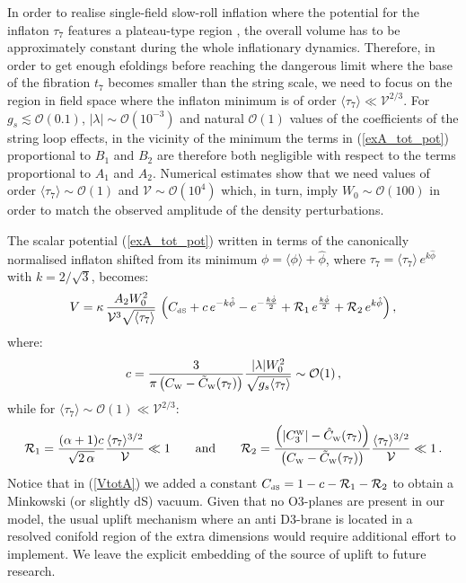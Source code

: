 \documentclass[11pt,a4paper]{article}
\newcommand{\be}{\begin{equation}}
\newcommand{\ee}{\end{equation}}
\def\nn{\nonumber}
\def\W{{\scriptscriptstyle \rm W}}
\def\dS{{\scriptscriptstyle \rm dS}}
\newcommand\vo{{\mathcal{V}}}
\newcommand{\mc}{\mathcal}
\begin{document}
In order to realise single-field slow-roll inflation where the potential for the inflaton $\tau_7$ features a plateau-type region \cite{Cicoli:2008gp, Cicoli:2016chb}, the overall volume has to be approximately constant during the whole inflationary dynamics. Therefore, in order to get enough efoldings before reaching the dangerous limit where the base of the fibration $t_7$ becomes smaller than the string scale, we need to focus on the region in field space where the inflaton minimum is of order $\langle\tau_7\rangle\ll \vo^{2/3}$. For $g_s\lesssim\mc{O}(0.1)$, $|\lambda|\sim\mc{O}(10^{-3})$ and natural $\mc{O}(1)$ values of the coefficients of the string loop effects, in the vicinity of the minimum the terms in (\ref{exA_tot_pot}) proportional to $B_1$ and $B_2$ are therefore both negligible with respect to the terms proportional to $A_1$ and $A_2$. Numerical estimates show that we need values of order $\langle\tau_7\rangle \sim\mc{O}(1)$ and $\vo \sim\mc{O}(10^4)$ which, in turn, imply $W_0\sim\mc{O}(100)$ in order to match the observed amplitude of the density perturbations. 

The scalar potential (\ref{exA_tot_pot}) written in terms of the canonically normalised inflaton shifted from its minimum $\phi = \langle \phi \rangle + \hat\phi$, where $\tau_7 = \langle \tau_7 \rangle \,e^{k\hat\phi}$ with $k=2/\sqrt{3}$, becomes:
\be
V = \kappa\,\frac{A_2 W_0^2}{\vo^3 \sqrt{\langle\tau_7\rangle}}\, \left(C_\dS + c\,e^{-k\hat\phi}- e^{-\frac{k\hat\phi}{2}} 
 + \mc{R}_1\,e^{\frac{k\hat\phi}{2}} +\mc{R}_2\,e^{k\hat\phi}\right),
\label{VtotA}
\ee
where:
\be
c = \frac{3}{\pi\left(C_\W - \tilde{C}_\W(\tau_7)\right)}
\frac{|\lambda| W_0^2}{\sqrt{g_s \langle\tau_7\rangle}}\sim \mc{O}(1)\,, \nn
\ee
while for $\langle\tau_7\rangle\sim \mc{O}(1)\ll\vo^{2/3}$:
\be
\mc{R}_1 = \frac{(\alpha+1) c}{\sqrt{2\,\alpha}} \frac{\langle\tau_7\rangle^{3/2}}{\vo}\ll 1
\qquad \text{and}\qquad \mc{R}_2 = \frac{\left(|C_3^\W| - \hat{C}_\W(\tau_7)\right)}{\left(C_\W - \tilde{C}_\W(\tau_7)\right)} 
\frac{\langle\tau_7\rangle^{3/2}}{\vo}\ll 1 \,. \nn
\ee
Notice that in (\ref{VtotA}) we added a constant $C_\dS= 1-c - \mc{R}_1 - \mc{R}_2$ to obtain a Minkowski (or slightly dS) vacuum. Given that no O3-planes are present in our model, the usual uplift mechanism where an anti D3-brane is located in a resolved conifold region of the extra dimensions would require additional effort to implement. We leave the explicit embedding of the source of uplift to future research. 
\end{document}
